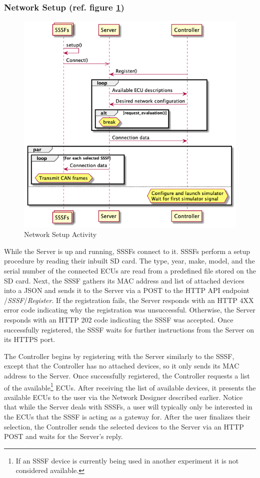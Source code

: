 \documentclass[letterpaper,twocolumn,12pt]{article}
\begin{document}
\subsubsection{Network Setup (ref. figure \ref{fig:setup_activity})}
\begin{figure}[]
    \centering
    \includegraphics[scale=0.8]{out/images/connection_setup/connection_setup.png}
    \caption{Network Setup Activity}
    \label{fig:setup_activity}
\end{figure}
While the Server is up and running, SSSFs connect to it. SSSFs perform a setup procedure by reading their inbuilt SD card. The type, year, make, model, and the serial number of the connected ECUs are read from a predefined file stored on the SD card. Next, the SSSF gathers its MAC address and list of attached devices into a JSON and sends it to the Server via a POST to the HTTP API endpoint /\textit{SSSF}/\textit{Register}. 
If the registration fails, the Server responds with an HTTP 4XX error code indicating why the registration was unsuccessful. Otherwise, the Server responds with an HTTP 202 code indicating the SSSF was accepted. Once successfully registered, the SSSF waits for further instructions from the Server on its HTTPS port. 

The Controller begins by registering with the Server similarly to the SSSF, except that the Controller has no attached devices, so it only sends its MAC address to the Server.
Once successfully registered, the Controller requests a list of the available{\footnote{If an SSSF device is currently being used in another experiment it is not considered available.}} ECUs. After receiving the list of available devices, it presents the available ECUs to the user via the Network Designer described earlier. Notice that while the Server deals with SSSFs, a user will typically only be interested in the ECUs that the SSSF is acting as a gateway for. After the user finalizes their selection, the Controller sends the selected devices to the Server via an HTTP POST and waits for the Server's reply.
\end{document}
